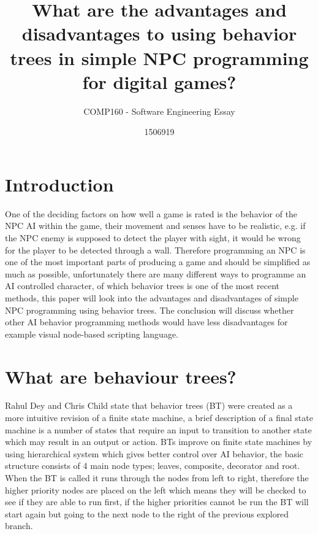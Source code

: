 \documentclass{scrartcl}
\title{What are the advantages and disadvantages to using behavior trees in simple NPC programming for digital games?}
\subtitle{COMP160 - Software Engineering Essay}
\author{1506919}
\begin{document}
\maketitle


\section{Introduction}

One of the deciding factors on how well a game is rated is the behavior of the NPC AI within the game, their movement and senses have to be realistic\cite{dey2013ql}, e.g. if the NPC enemy is supposed to detect the player with sight, it would be wrong for the player to be detected through a wall. Therefore programming an NPC is one of the most important parts of producing a game\cite{buckland2005programming} and should be simplified as much as possible, unfortunately there are many different ways to programme an AI controlled character, of which behavior trees is one of the most recent methods\cite{GDCVault}, this paper will look into the advantages and disadvantages of simple NPC programming using behavior trees. The conclusion will discuss whether other AI behavior programming methods would have less disadvantages for example visual node-based scripting language.

\section{What are behaviour trees?}

Rahul Dey and Chris Child state that behavior trees (BT) were created as a more intuitive revision of a finite state machine\cite{dey2013ql}, a brief description of a final state machine is a number of states that require an input to transition to another state which may result in an output or action\cite{buckland2005programming}. BTs improve on finite state machines by using hierarchical system which gives better control over AI behavior, the basic structure consists of 4 main node types\cite{gamasutra}; leaves, composite, decorator and root. When the BT is called it runs through the nodes from left to right, therefore the higher priority nodes are placed on the left which means they will be checked to see if they are able to run first, if the higher priorities cannot be run the BT will start again but going to the next node to the right of the previous explored branch. 
\end{document}
